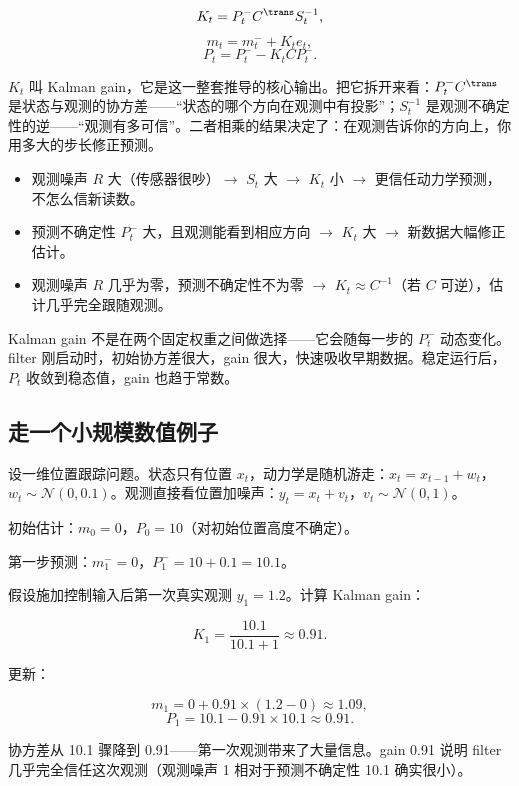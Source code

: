 \[
K_t = P_t^- C^{\trans} S_t^{-1},
\]
\[
m_t = m_t^- + K_t e_t,
\]
\[
P_t = P_t^- - K_t C P_t^-.
\]

\(K_t\) 叫 Kalman gain，它是这一整套推导的核心输出。把它拆开来看：\(P_t^- C^{\trans}\) 是状态与观测的协方差——``状态的哪个方向在观测中有投影''；\(S_t^{-1}\) 是观测不确定性的逆——``观测有多可信''。二者相乘的结果决定了：在观测告诉你的方向上，你用多大的步长修正预测。

\begin{itemize}
\tightlist
\item
  观测噪声 \(R\) 大（传感器很吵）\(\rightarrow\) \(S_t\) 大 \(\rightarrow\) \(K_t\) 小 \(\rightarrow\) 更信任动力学预测，不怎么信新读数。
\item
  预测不确定性 \(P_t^-\) 大，且观测能看到相应方向 \(\rightarrow\) \(K_t\) 大 \(\rightarrow\) 新数据大幅修正估计。
\item
  观测噪声 \(R\) 几乎为零，预测不确定性不为零 \(\rightarrow\) \(K_t \approx C^{-1}\)（若 \(C\) 可逆），估计几乎完全跟随观测。
\end{itemize}

Kalman gain 不是在两个固定权重之间做选择——它会随每一步的 \(P_t^-\) 动态变化。filter 刚启动时，初始协方差很大，gain 很大，快速吸收早期数据。稳定运行后，\(P_t\) 收敛到稳态值，gain 也趋于常数。

\subsection{走一个小规模数值例子}

设一维位置跟踪问题。状态只有位置 \(x_t\)，动力学是随机游走：\(x_t = x_{t-1} + w_t\)，\(w_t \sim \mathcal{N}(0, 0.1)\)。观测直接看位置加噪声：\(y_t = x_t + v_t\)，\(v_t \sim \mathcal{N}(0, 1)\)。

初始估计：\(m_0 = 0\)，\(P_0 = 10\)（对初始位置高度不确定）。

第一步预测：\(m_1^- = 0\)，\(P_1^- = 10 + 0.1 = 10.1\)。

假设施加控制输入后第一次真实观测 \(y_1 = 1.2\)。计算 Kalman gain：

\[
K_1 = \frac{10.1}{10.1 + 1} \approx 0.91.
\]

更新：

\[
m_1 = 0 + 0.91 \times (1.2 - 0) \approx 1.09,
\]
\[
P_1 = 10.1 - 0.91 \times 10.1 \approx 0.91.
\]

协方差从 10.1 骤降到 0.91——第一次观测带来了大量信息。gain 0.91 说明 filter 几乎完全信任这次观测（观测噪声 1 相对于预测不确定性 10.1 确实很小）。

